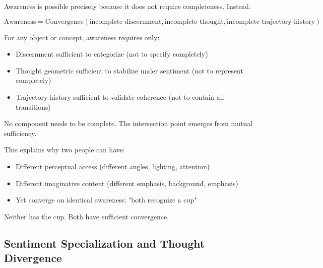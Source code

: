 \begin{theorem}
\label{thm:sufficiency-foundation}
Awareness is possible precisely because it does not require completeness. Instead:

\begin{equation}
\text{Awareness} = \text{Convergence}(\text{incomplete discernment}, \text{incomplete thought}, \text{incomplete trajectory-history})
\end{equation}

For any object or concept, awareness requires only:
\begin{itemize}
\item Discernment sufficient to categorize (not to specify completely)
\item Thought geometric sufficient to stabilize under sentiment (not to represent completely)
\item Trajectory-history sufficient to validate coherence (not to contain all transitions)
\end{itemize}

No component needs to be complete. The intersection point emerges from mutual sufficiency.

This explains why two people can have:
\begin{itemize}
\item Different perceptual access (different angles, lighting, attention)
\item Different imaginative content (different emphasis, background, emphasis)
\item Yet converge on identical awareness: "both recognize a cup"
\end{itemize}

Neither has the cup. Both have sufficient convergence.
\end{theorem}

\subsection{Sentiment Specialization and Thought Divergence}


